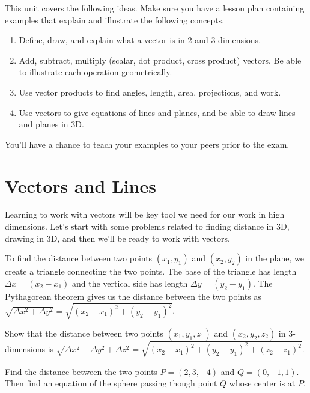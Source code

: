 
\noindent 
This unit covers the following ideas. Make sure you have a lesson plan containing examples that explain and illustrate the following concepts.  
\begin{enumerate}
\item Define, draw, and explain what a vector is in 2 and 3 dimensions. 
\item Add, subtract, multiply (scalar, dot product, cross product) vectors. Be able to illustrate each operation geometrically. 
\item Use vector products to find angles, length, area, projections, and work.
\item Use vectors to give equations of lines and planes, and be able to draw lines and planes in 3D. 

\end{enumerate}
You'll have a chance to teach your examples to your peers prior to the exam.

\section{Vectors and Lines}
Learning to work with vectors will be key tool we need for our work in high dimensions.  Let's start with some problems related to finding distance in 3D, drawing in 3D, and then we'll be ready to work with vectors.


\begin{problem}
To find the distance between two points $(x_1,y_1)$ and $(x_2,y_2)$ in the plane, we create a triangle connecting the two points.  The base of the triangle has length $\Delta x=(x_2-x_1)$ and the vertical side has length $\Delta y=(y_2-y_1)$. The Pythagorean theorem gives us the distance between the two points as $\sqrt{\Delta x^2+\Delta y^2}=\sqrt{(x_2-x_1)^2+(y_2-y_1)^2}$.

Show that the distance between two points $(x_1,y_1,z_1)$ and $(x_2,y_2,z_2)$ in 3-dimensions is $\sqrt{\Delta x^2+\Delta y^2+\Delta z^2}=\sqrt{(x_2-x_1)^2+(y_2-y_1)^2+(z_2-z_1)^2}$.
\end{problem}


\begin{problem}
Find the distance between the two points $P=(2,3,-4)$ and $Q=(0,-1,1)$. Then find an equation of the sphere passing though point $Q$ whose center is at $P$. 
\end{problem}


